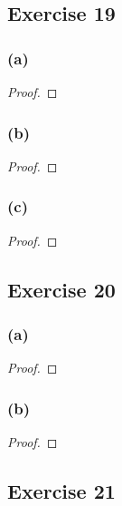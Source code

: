 \documentclass[14pt]{extarticle}
\begin{document}
\subsection{Exercise 19}

\subsubsection{(a)}

\begin{proof}

\end{proof}

\subsubsection{(b)}

\begin{proof}

\end{proof}

\subsubsection{(c)}

\begin{proof}

\end{proof}

\subsection{Exercise 20}

\subsubsection{(a)}

\begin{proof}

\end{proof}

\subsubsection{(b)}

\begin{proof}

\end{proof}

\subsection{Exercise 21}
\end{document}
